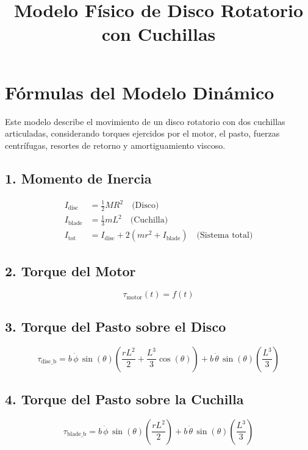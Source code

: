 \documentclass{article}
\title{Modelo Físico de Disco Rotatorio con Cuchillas}
\author{}
\date{}
\begin{document}
\maketitle

\section*{Fórmulas del Modelo Dinámico}

Este modelo describe el movimiento de un disco rotatorio con dos cuchillas articuladas, considerando torques ejercidos por el motor, el pasto, fuerzas centrífugas, resortes de retorno y amortiguamiento viscoso.

\subsection*{1. Momento de Inercia}

\begin{align*}
I_{\text{disc}} &= \frac{1}{2} M R^2 \quad \text{(Disco)} \\
I_{\text{blade}} &= \frac{1}{3} m L^2 \quad \text{(Cuchilla)} \\
I_{\text{tot}} &= I_{\text{disc}} + 2 \left( m r^2 + I_{\text{blade}} \right) \quad \text{(Sistema total)}
\end{align*}

\subsection*{2. Torque del Motor}

\[
\tau_{\text{motor}}(t) = f(t)
\]

\subsection*{3. Torque del Pasto sobre el Disco}

\[
\tau_{\text{disc\_b}} = b \, \dot{\phi} \, \sin(\theta) \left( \frac{rL^2}{2} + \frac{L^3}{3} \cos(\theta) \right) + b \, \dot{\theta} \, \sin(\theta) \left( \frac{L^3}{3} \right)
\]

\subsection*{4. Torque del Pasto sobre la Cuchilla}

\[
\tau_{\text{blade\_b}} = b \, \dot{\phi} \, \sin(\theta) \left( \frac{rL^2}{2} \right) + b \, \dot{\theta} \, \sin(\theta) \left( \frac{L^3}{3} \right)
\]
\end{document}
